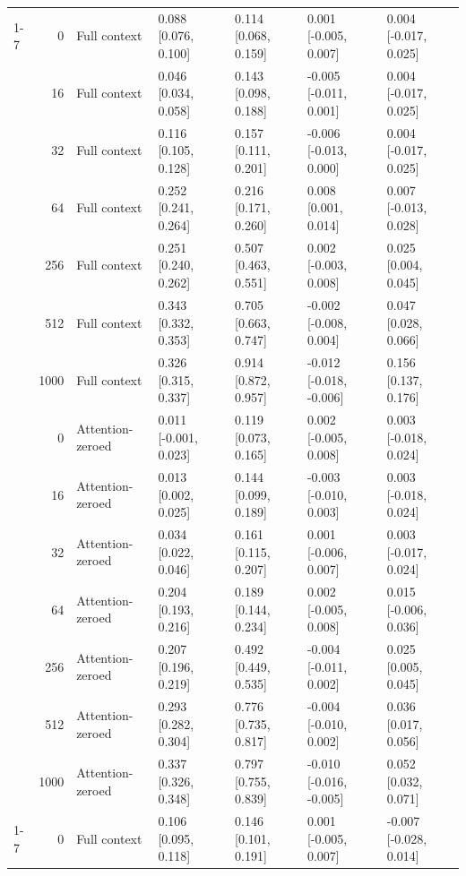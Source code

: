 \documentclass[11pt]{article}
\begin{document}
\begin{longtable}[t]{lrlllll}
\cmidrule{1-7}\pagebreak[0]
 & 0 & Full context & 0.088 [0.076, 0.100] & 0.114 [0.068, 0.159] & 0.001 [-0.005, 0.007] & 0.004 [-0.017, 0.025]\\
\nopagebreak
 & 16 & Full context & 0.046 [0.034, 0.058] & 0.143 [0.098, 0.188] & -0.005 [-0.011, 0.001] & 0.004 [-0.017, 0.025]\\
\nopagebreak
 & 32 & Full context & 0.116 [0.105, 0.128] & 0.157 [0.111, 0.201] & -0.006 [-0.013, 0.000] & 0.004 [-0.017, 0.025]\\
\nopagebreak
 & 64 & Full context & 0.252 [0.241, 0.264] & 0.216 [0.171, 0.260] & 0.008 [0.001, 0.014] & 0.007 [-0.013, 0.028]\\
\nopagebreak
 & 256 & Full context & 0.251 [0.240, 0.262] & 0.507 [0.463, 0.551] & 0.002 [-0.003, 0.008] & 0.025 [0.004, 0.045]\\
\nopagebreak
 & 512 & Full context & 0.343 [0.332, 0.353] & 0.705 [0.663, 0.747] & -0.002 [-0.008, 0.004] & 0.047 [0.028, 0.066]\\
\nopagebreak
 & 1000 & Full context & 0.326 [0.315, 0.337] & 0.914 [0.872, 0.957] & -0.012 [-0.018, -0.006] & 0.156 [0.137, 0.176]\\
\nopagebreak
 & 0 & Attention-zeroed & 0.011 [-0.001, 0.023] & 0.119 [0.073, 0.165] & 0.002 [-0.005, 0.008] & 0.003 [-0.018, 0.024]\\
\nopagebreak
 & 16 & Attention-zeroed & 0.013 [0.002, 0.025] & 0.144 [0.099, 0.189] & -0.003 [-0.010, 0.003] & 0.003 [-0.018, 0.024]\\
\nopagebreak
 & 32 & Attention-zeroed & 0.034 [0.022, 0.046] & 0.161 [0.115, 0.207] & 0.001 [-0.006, 0.007] & 0.003 [-0.017, 0.024]\\
\nopagebreak
 & 64 & Attention-zeroed & 0.204 [0.193, 0.216] & 0.189 [0.144, 0.234] & 0.002 [-0.005, 0.008] & 0.015 [-0.006, 0.036]\\
\nopagebreak
 & 256 & Attention-zeroed & 0.207 [0.196, 0.219] & 0.492 [0.449, 0.535] & -0.004 [-0.011, 0.002] & 0.025 [0.005, 0.045]\\
\nopagebreak
 & 512 & Attention-zeroed & 0.293 [0.282, 0.304] & 0.776 [0.735, 0.817] & -0.004 [-0.010, 0.002] & 0.036 [0.017, 0.056]\\
\nopagebreak
\multirow{-14}{*}{\raggedright\arraybackslash Pythia-410M} & 1000 & Attention-zeroed & 0.337 [0.326, 0.348] & 0.797 [0.755, 0.839] & -0.010 [-0.016, -0.005] & 0.052 [0.032, 0.071]\\
\cmidrule{1-7}\pagebreak[0]
 & 0 & Full context & 0.106 [0.095, 0.118] & 0.146 [0.101, 0.191] & 0.001 [-0.005, 0.007] & -0.007 [-0.028, 0.014]\\

\end{longtable}
\end{document}
